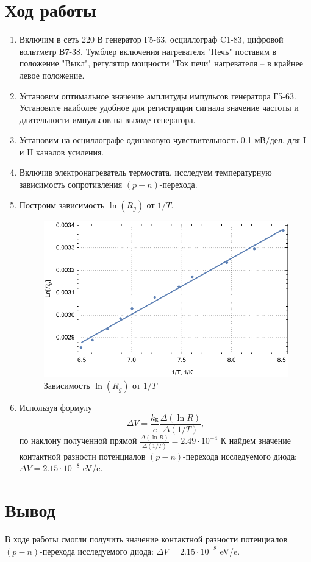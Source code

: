 \documentclass[a4paper, 12pt]{article}
\begin{document}
	\section{Ход работы}
	\begin{enumerate}
		\item Включим в сеть 220 В генератор Г5-63, осциллограф C1-83, цифровой вольтметр В7-38. Тумблер включения нагревателя "Печь" поставим в положение "Выкл", регулятор мощности "Ток печи" нагревателя -- в крайнее левое положение.
		\item Установим оптимальное значение амплитуды импульсов генератора Г5-63. Установите наиболее удобное для регистрации сигнала значение частоты и длительности импульсов на выходе генератора.
		\item Установим на осциллографе одинаковую чувствительность 0.1 мВ/дел. для I и II каналов усиления.
		\item Включив электронагреватель термостата, исследуем температурную зависимость сопротивления $(p-n)$-перехода.
		\item Построим зависимость $\ln{(R_g)}$ от $1/T$.
		\begin{figure}[!htb]
			\centering
			\includegraphics[scale=1]{plot.pdf}
			\caption{Зависимость $\ln{(R_g)}$ от $1/T$}
		\end{figure}
		\item Используя формулу
		\begin{equation*}
			\Delta V=\frac{k_{\text{Б}}}{e}\frac{\Delta(\ln{R})}{\Delta(1/T)},
		\end{equation*}
		по наклону полученной прямой $\frac{\Delta(\ln{R})}{\Delta(1/T)}=2.49\cdot 10^{-4}$ К найдем значение контактной разности потенциалов $(p-n)$-перехода исследуемого диода: $\Delta V=2.15\cdot 10^{-8}$ eV/e.
	\end{enumerate}
	\section{Вывод}
	В ходе работы смогли получить значение контактной разности потенциалов $(p-n)$-перехода исследуемого диода: $\Delta V=2.15\cdot 10^{-8}$ eV/e.
\end{document}
